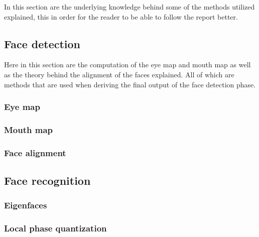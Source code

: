 In this section are the underlying knowledge behind some of the methods utilized explained, this in order for the reader to be able to follow the report better.

\subsection{Face detection}

Here in this section are the computation of the eye map and mouth map as well as the theory behind the alignment of the faces explained. All of which are methods that are used when deriving the final output of the face detection phase.

\subsubsection{Eye map}
\label{sub:FaceDetection}


\subsubsection{Mouth map}


\subsubsection{Face alignment}


\subsection{Face recognition}
\label{sub:FaceRecognition}


\subsubsection{Eigenfaces}
\label{subs:Eigenfaces}


\subsubsection{Local phase quantization}
\label{subs:LocalPhaseQuantization}

